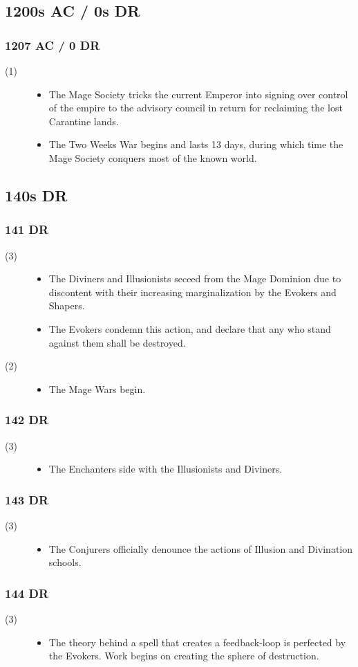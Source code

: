 \documentclass[a4paper, 11pt]{article}
\def\level#1{\item[(#1)\hspace{9.5pt}]}
\newenvironment{knowlevels}{\begin{description}}{\end{description}} %
\def\decadeblk#1{\subsection{#1}}
\def\yearblk#1{\subsubsection{#1}}
\begin{document}
\decadeblk{1200s AC / 0s DR}
\yearblk{1207 AC / 0 DR}
\begin{knowlevels}
\level{1} {
\begin{itemize}
\item The Mage Society tricks the current Emperor into signing over control of the empire to the advisory council in return for reclaiming the lost Carantine lands.
\item The Two Weeks War begins and lasts 13 days, during which time the Mage Society conquers most of the known world. 
\end{itemize}
}
\end{knowlevels}

\decadeblk{140s DR}
\yearblk{141 DR}
\begin{knowlevels}
\level{3} {
\begin{itemize}
\item The Diviners and Illusionists seceed from the Mage Dominion due to discontent with their increasing marginalization by the Evokers and Shapers.
\item The Evokers condemn this action, and declare that any who stand against them shall be destroyed.
\end{itemize}
}
\level{2} {
\begin{itemize}
\item The Mage Wars begin.
\end{itemize}
}
\end{knowlevels}

\yearblk{142 DR}
\begin{knowlevels}
\level{3} {
\begin{itemize}
\item The Enchanters side with the Illusionists and Diviners. 
\end{itemize}
}
\end{knowlevels}

\yearblk{143 DR}
\begin{knowlevels}
\level{3} {
\begin{itemize}
\item The Conjurers officially denounce the actions of Illusion and Divination schools.
\end{itemize}
}
\end{knowlevels}

\yearblk{144 DR}
\begin{knowlevels}
\level{3} {
\begin{itemize}
\item The theory behind a spell that creates a feedback-loop is perfected by the Evokers. Work begins on creating the sphere of destruction.
\end{itemize}
}
\end{knowlevels}
\end{document}

